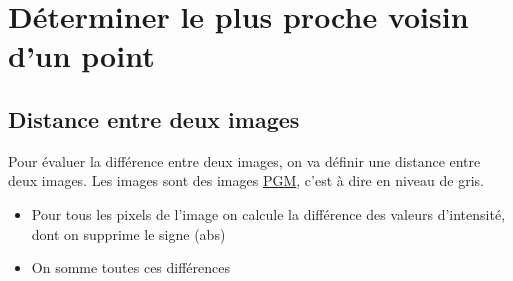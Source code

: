 \documentclass[usenames,dvipsnames,hyperref={pdfpagemode=FullScreen},9pt,t]{beamer}
\begin{document}
\section{Déterminer le plus proche voisin d'un point}

\subsection{Distance entre deux images}
\begin{frame}
        Pour évaluer la différence entre deux images, on va définir une distance
    entre deux images. Les images sont des images
    \href{https://fr.wikipedia.org/wiki/Portable_pixmap\#Fichier_binaire_2}{PGM},
    c'est à dire en niveau de gris.

\begin{itemize}
\item
  Pour tous les pixels de l'image on calcule la différence des valeurs
  d'intensité, dont on supprime le signe (abs)
\item
  On somme toutes ces différences
\end{itemize}
\begin{center}
\end{center}
\end{frame}
\end{document}
